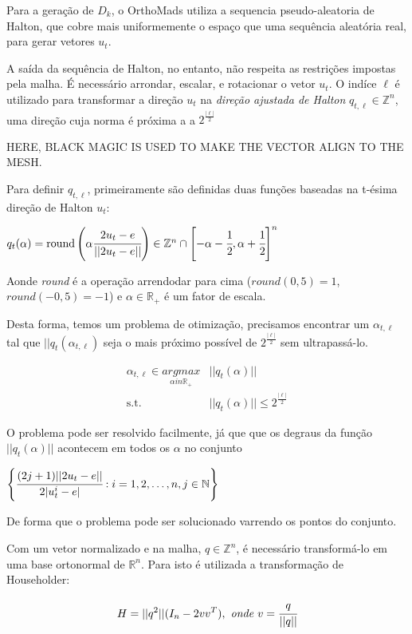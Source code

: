 Para a geração de $D_k$, o OrthoMads utiliza a sequencia pseudo-aleatoria de Halton, que cobre mais uniformemente o espaço que uma sequência aleatória real, para  gerar vetores $u_t$.

A saída da sequência de Halton, no entanto, não respeita as restrições impostas pela malha. É necessário arrondar, escalar, e rotacionar o vetor $u_t$. O indíce $\ell$ é utilizado para transformar a direção $u_t$ na \textit{direção ajustada de Halton} $q_{t,\ell} \in \mathbb{Z}^n$, uma direção cuja norma é próxima a a $2^{\frac{|\ell|}{2}}$

HERE, BLACK MAGIC IS USED TO MAKE THE VECTOR ALIGN TO THE MESH.

Para definir $q_{t,\ell}$, primeiramente são definidas duas funções baseadas na t-ésima direção de Halton $u_t$:

$q_t(\alpha) = \text{round} \left ( \alpha \cfrac{2u_t - e}{||2u_t - e||} \right ) \in \mathbb{Z}^n \cap \left [ -\alpha - \cfrac{1}{2}, \alpha + \cfrac{1}{2}  \right ]^n$

Aonde \textit{round} é a operação arrendodar para cima ($round(0,5)=1$, $round(-0,5) = -1$) e $\alpha \in \mathbb{R}_+$ é um fator de escala. 

Desta forma, temos um problema de otimização, precisamos encontrar um $\alpha_{t,\ell}$ tal que $||q_t(\alpha_{t,\ell})$ seja o mais próximo possível de $2^{\frac{|\ell|}{2}}$ sem ultrapassá-lo.

\begin{align*}
\alpha_{t,\ell} \in \underset{\alpha in \mathbb{R}_+}{\textit{argmax}} & ||q_t(\alpha)|| \\
\text{s.t.} & ||q_t(\alpha)|| \leq 2^{\frac{|\ell|}{2}}
\end{align*}

O problema pode ser resolvido facilmente, já que que os degraus da função $||q_t(\alpha)||$ acontecem em todos os $\alpha$ no conjunto

\begin{center}
$ \left \{ \cfrac{(2j+1)||2u_t - e||}{2|u^i_t - e|} : i = 1,2,\dots,n,j \in \mathbb{N} \right \}$
\end{center}
De forma que o problema pode ser solucionado varrendo os pontos do conjunto.

Com um vetor normalizado e na malha, $q \in \mathbb{Z}^n$, é necessário transformá-lo em uma base ortonormal de $\mathbb{R}^n$. Para isto é utilizada a transformação de Householder:

\begin{equation}
H = ||q^2||(I_n - 2vv^T),\textit{ onde }v = \cfrac{q}{||q||}
\end{equation}

